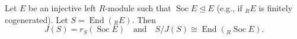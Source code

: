 Let $E$ be an injective left $R$-module such that $\operatorname{Soc} E \trianglelefteq E$ (e.g., if ${}_R E$ is finitely cogenerated). Let $S = \operatorname{End}({}_R E)$. Then
$$J(S) = r_S(\operatorname{Soc} E) \quad \text{and} \quad S/J(S) \cong \operatorname{End}({}_R \operatorname{Soc} E).$$
